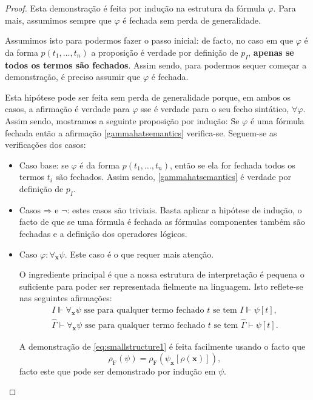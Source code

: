 \documentclass{report}
\theoremstyle{definition}
\theoremstyle{remark}
\renewcommand{\bf}[1]{\mathbf{#1}}
\newcommand{\F}{\mathrm{F}}
\newcommand{\imply}{\mathbin{\Rightarrow}}
\begin{document}
	\begin{proof}
	Esta demonstração é feita por indução na estrutura da fórmula $\varphi$. Para mais, assumimos sempre que $\varphi$ é fechada sem perda de generalidade.
	
	Assumimos isto para podermos fazer o passo inicial: de facto, no caso em que $\varphi$ é da forma $p(t_1, \dots, t_n)$ a proposição é verdade por definição de $p_I$, \textbf{apenas se todos os termos são fechados}. Assim sendo, para podermos sequer começar a demonstração, é preciso assumir que $\varphi$ é fechada.
	
	Esta hipótese pode ser feita sem perda de generalidade porque, em ambos os casos, a afirmação é verdade para $\varphi$ sse é verdade para o seu fecho sintático, $\forall \varphi$. Assim sendo, mostramos a seguinte proposição por indução: Se $\varphi$ é uma fórmula fechada então a afirmação \eqref{gammahatsemantics} verifica-se. Seguem-se as verificações dos casos:
	
	\begin{itemize}
	\item Caso base: se $\varphi$ é da forma $p(t_1, \dots, t_n)$, então se ela for fechada todos os termos $t_i$ são fechados. Assim sendo, \eqref{gammahatsemantics} é verdade por definição de $p_I$.
	
	\item Casos $\imply$ e $\neg$: estes casos são triviais. Basta aplicar a hipótese de indução, o facto de que se uma fórmula é fechada as fórmulas componentes também são fechadas e a definição dos operadores lógicos.
	
	\item Caso $\varphi : \forall_{\bf x} \psi$. Este caso é o que requer mais atenção.
	
	O ingrediente principal é que a nossa estrutura de interpretação é pequena o suficiente para poder ser representada fielmente na linguagem. Isto reflete-se nas seguintes afirmações:
\begin{gather}
I \Vdash \forall_{\bf x} \psi \text{ sse para qualquer termo fechado $t$ se tem } I \Vdash \psi[t],\label{eq:smallstructure1}\\
\widehat\Gamma \vdash \forall_{\bf x} \psi \text{ sse para qualquer termo fechado $t$ se tem } \widehat\Gamma \vdash \psi[t].\label{eq:smallstructure2}
\end{gather}

	A demonstração de \eqref{eq:smallstructure1} é feita facilmente usando o facto que
\[\rho_\F(\psi) = \rho_\F(\psi_{\bf x}[\rho(\bf x)]),\]
	facto este que pode ser demonstrado por indução em $\psi$.


\end{itemize}
\end{proof}
\end{document}
